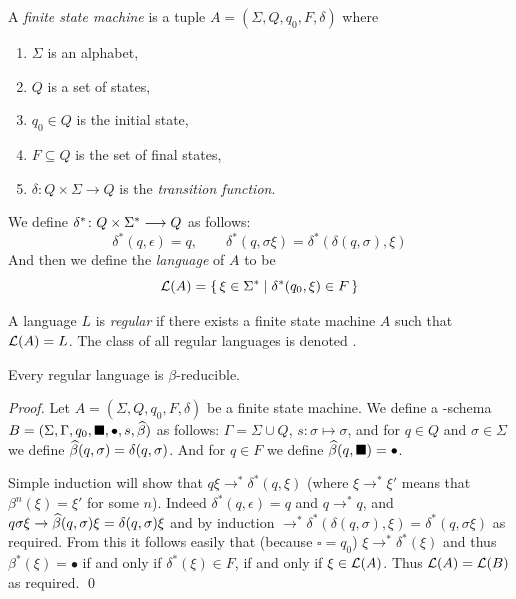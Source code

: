 \documentclass{llncs}
\begin{document}
\begin{definition}

    A \emph{finite state machine} is a tuple $A=(\Sigma,Q,q_0,F,\delta)$ where
    \begin{enumerate}
        \item $\Sigma$ is an alphabet,
        \item $Q$ is a set of states,
        \item $q_0\in Q$ is the initial state,
        \item $F\subseteq Q$ is the set of final states,
        \item $\delta\colon Q\times\Sigma\to Q$ is the \emph{transition function}.
    \end{enumerate}
    We define $\delta^*\colon Q\times\Sigma^*\longrightarrow Q$ as follows:
    \[ \delta^*(q,\epsilon)=q,\qquad \delta^*(q,\sigma\xi)=\delta^*(\delta(q,\sigma),\xi) \]
    And then we define the \emph{language} of $A$ to be
    \[ \c L(A) = \set{\xi\in\Sigma^*}[\delta^*(q_0,\xi)\in F] \]

    A language $L$ is \emph{regular} if there exists a finite state machine $A$ such that $\mathcal{L}(A)=L$.
    The class of all regular languages is denoted \REG.

\end{definition}

\begin{theorem}

    Every regular language is $\beta$-reducible.

\end{theorem}

\begin{proof}

    Let $A=(\Sigma,Q,q_0,F,\delta)$ be a finite state machine.
    We define a \BR-schema $B=(\Sigma,\Gamma,q_0,\blacksquare,\bullet,s,\widehat\beta)$ as follows: $\Gamma=\Sigma\cup Q$, $s\colon\sigma\mapsto\sigma$, and for $q\in Q$ and $\sigma\in\Sigma$ we define $\widehat\beta(q,\sigma)=\delta(q,\sigma)$.
    And for $q\in F$ we define $\widehat\beta(q,\blacksquare)=\bullet$.

    Simple induction will show that $q\xi\to^*\delta^*(q,\xi)$ (where $\xi\to^*\xi'$ means that $\beta^n(\xi)=\xi'$ for some $n$).
    Indeed $\delta^*(q,\epsilon)=q$ and $q\to^*q$, and $q\sigma\xi\to\widehat\beta(q,\sigma)\xi=\delta(q,\sigma)\xi$ and by induction $\to^*\delta^*(\delta(q,\sigma),\xi)=\delta^*(q,\sigma\xi)$ as required.
    From this it follows easily that (because $\square=q_0$) $\xi\to^*\delta^*(\xi)$ and thus $\beta^*(\xi)=\bullet$ if and only if $\delta^*(\xi)\in F$, if and only if $\xi\in\mathcal{L}(A)$.
    Thus $\mathcal{L}(A)=\mathcal{L}(B)$ as required.
    \qed

\end{proof}
\end{document}
